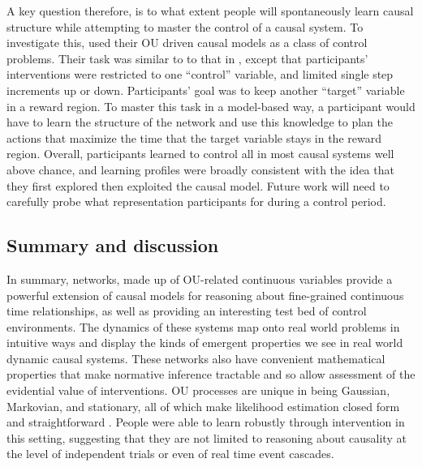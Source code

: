 \documentclass{cambridge7A}%
\newcommand{\ttodo}[2][]{\vspace{0.1cm} \hfil \todo[caption={\textbf{TG}}, size=\footnotesize, color = orange, inline, #1]{#2}}
\begin{document}
A key question therefore, is to what extent people will spontaneously learn causal structure while attempting to master the control of a causal system.  To investigate this, \cite{davis2018control} used their OU driven causal models as a class of control problems.   Their task was similar to to that in \cite{davis2018ctcv}, except that participants' interventions were restricted to one ``control'' variable, and limited single step increments up or down.  Participants' goal was to keep another ``target'' variable in a reward region.  To master this task in a model-based way, a participant would have to learn the structure of the network and use this knowledge to plan the actions that maximize the time that the target variable stays in the reward region.  %
Overall, participants learned to control all in most causal systems well above chance, and learning profiles were broadly consistent with the idea that they first explored then exploited the causal model.  Future work will need to carefully probe what representation participants for during a control period.


\subsection{Summary and discussion}

In summary, networks, made up of OU-related continuous variables provide a powerful extension of causal models for reasoning about fine-grained continuous time relationships, as well as providing an interesting test bed of control environments.  The dynamics of these systems map onto real world problems in intuitive ways and display the kinds of emergent properties we see in real world dynamic causal systems.  These networks also have convenient mathematical properties that make normative inference tractable and so allow assessment of the evidential value of interventions.  OU processes are unique in being Gaussian, Markovian, and stationary, all of which make likelihood estimation closed form and straightforward \citep{uhlenbeck1930theory}.  %
People were able to learn robustly through intervention in this setting, suggesting that they are not limited to reasoning about causality at the level of independent trials or even of real time event cascades.
\end{document}

